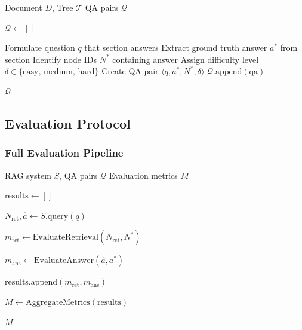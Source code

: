 \begin{algorithm}[H]
\caption{Create Supervised Dataset}
\begin{algorithmic}[1]
\Require Document $D$, Tree $\mathcal{T}$
\Ensure QA pairs $\mathcal{Q}$

\State $\mathcal{Q} \gets []$

    \State Formulate question $q$ that section answers
    \State Extract ground truth answer $a^*$ from section
    \State Identify node IDs $N^*$ containing answer
    \State Assign difficulty level $\delta \in \{\text{easy, medium, hard}\}$
    \State Create QA pair $\langle q, a^*, N^*, \delta \rangle$
    \State $\mathcal{Q}.\text{append}(\text{qa})$
\EndFor

\State \Return $\mathcal{Q}$
\end{algorithmic}
\end{algorithm}

\subsection{Evaluation Protocol}

\subsubsection{Full Evaluation Pipeline}

\begin{algorithm}[H]
\caption{Evaluate RAG System}
\begin{algorithmic}[1]
\Require RAG system $S$, QA pairs $\mathcal{Q}$
\Ensure Evaluation metrics $M$

\State $\text{results} \gets []$

    \State $N_{\text{ret}}, \hat{a} \gets S.\text{query}(q)$
    
    \State $m_{\text{ret}} \gets \text{EvaluateRetrieval}(N_{\text{ret}}, N^*)$
    
    \State $m_{\text{ans}} \gets \text{EvaluateAnswer}(\hat{a}, a^*)$
    
    \State $\text{results.append}(m_{\text{ret}}, m_{\text{ans}})$
\EndFor

\State $M \gets \text{AggregateMetrics}(\text{results})$

\State \Return $M$
\end{algorithmic}
\end{algorithm}

